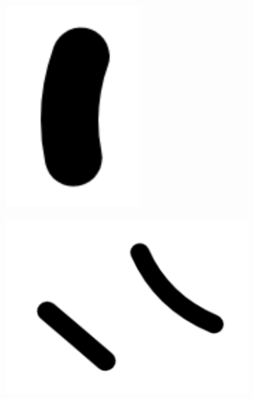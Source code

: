 \documentclass[%
reprint,
twocolumn,
nofootinbib,
 amsmath,amssymb,
 aps,
]{revtex4-2}
\begin{document}
\begin{figure}
    \begin{subfigure}{0.1\textwidth}
        \includegraphics[width=0.98\linewidth]{img/seg5.png}
    \end{subfigure}
    \begin{subfigure}{0.2\textwidth}
        \includegraphics[width=0.98\linewidth]{img/seg3.png}

\end{subfigure}
\end{figure}
\end{document}
